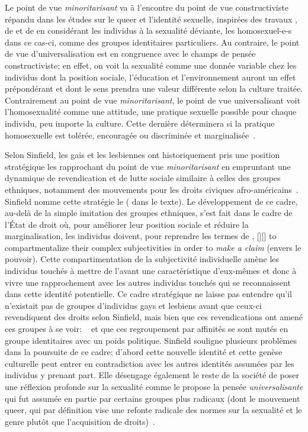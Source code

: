 Le point de vue \emph{minoritarisant} va à l'encontre du point de vue constructiviste répandu dans les études sur le queer et l'identité sexuelle, inspirées des travaux \citet{Foucault2011}, de \citet{Rubin2010} et de \citet{Butler2007} en considérant les individus à la sexualité déviante, les homosexuel-e-s dans ce cas-ci, comme des groupes identitaires particuliers. 
Au contraire, le point de vue d'universalisation est en congruence avec le champs de pensée constructiviste; en effet, on voit la sexualité comme une donnée variable chez les individus dont la position sociale, l'éducation et l'environnement auront un effet prépondérant et dont le sens prendra une valeur différente selon la culture traitée. 
Contrairement au point de vue \emph{minoritarisant}, le point de vue universalisant voit l'homosexualité comme une attitude, une pratique sexuelle possible pour chaque individu, peu importe la culture. 
Cette dernière déterminera si la pratique homosexuelle est tolérée, encouragée ou discriminée et marginalisée~\citep[271]{Sinfield1996}.

Selon Sinfield, les gais et les lesbiennes ont historiquement pris une position stratégique les rapprochant du point de vue \emph{minoritarisant} en empruntant une dynamique de revendication et de lutte sociale similaire à celles des groupes ethniques, notamment des mouvements pour les droits civiques afro-américains~\citep[271]{Sinfield1996}. 
Sinfield nomme cette stratégie le  ( dans le texte). 
Le développement de ce cadre, au-delà de la simple imitation des groupes ethniques, s'est fait dans le cadre de l'État de droit où, pour améliorer leur position sociale et réduire la marginalisation, les individus doivent, pour reprendre les termes de \citet{Sinfield1996}, [{\citeyear[272]{Sinfield1996}}][]{\textelp{} to   compartmentalize their complex subjectivities in order to \emph{make a claim} (envers le pouvoir)}.
Cette compartimentation de la subjectivité individuelle amène les individus touchés à mettre de l'avant une caractéristique d'eux-mêmes et donc à vivre une rapprochement avec les autres individus touchés qui se reconnaissent dans cette identité potentielle. 
Ce cadre stratégique ne laisse pas entendre qu'il n'existait pas de groupes d'individus gays et lesbiens avant que ceux-ci revendiquent des droits selon Sinfield, mais bien que ces revendications ont amené ces groupes à se voir:  ~\citep[272]{Sinfield1996} et que ces regroupement par affinités se sont mutés en groupe identitaires avec un poids politique. 
Sinfield souligne plusieurs problèmes dans la poursuite de ce cadre; d'abord cette nouvelle identité et cette genèse culturelle peut entrer en contradiction avec les autres identités assumées par les individus y prenant part. 
Elle désengage également le reste de la société de poser une réflexion profonde sur la sexualité comme le propose la pensée \emph{universalisante} qui fut assumée en partie par certains groupes plus radicaux (dont le mouvement queer, qui par définition vise une refonte radicale des normes sur la sexualité et le genre plutôt que l'acquisition de droits)~\citep[273]{Sinfield1996}.

